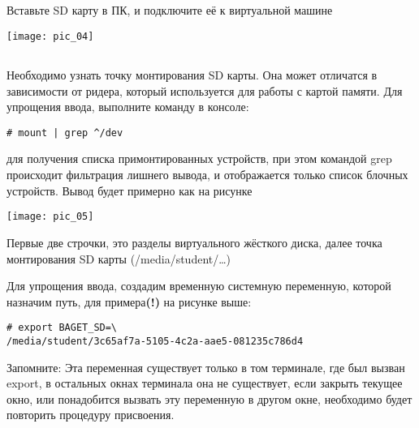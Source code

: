 \subsection{}Вставьте SD карту в ПК, и подключите её к виртуальной машине
\begin{center}
	\texttt{[image: pic\_04]}
\end{center}

\subsection{}Необходимо узнать точку монтирования SD карты. Она может отличатся в зависимости от ридера, который  используется для работы с картой памяти. Для упрощения ввода, выполните команду в консоле:
\begin{lstlisting}[style=bash]
# mount | grep ^/dev
\end{lstlisting}
для получения списка примонтированных устройств, при этом командой grep происходит фильтрация лишнего вывода, и отображается только список блочных устройств. Вывод будет примерно как на рисунке

\begin{center}
	\texttt{[image: pic\_05]}
\end{center}

Первые две строчки, это разделы виртуального жёсткого диска, далее точка монтирования SD карты (/media/student/…)

Для упрощения ввода, создадим временную системную переменную, которой назначим путь, для примера\textbf{(!)} на рисунке выше:
\begin{lstlisting}[style=bash]
# export BAGET_SD=\
/media/student/3c65af7a-5105-4c2a-aae5-081235c786d4
\end{lstlisting}

\begin{Notes}{Запомните:}
	Эта переменная существует только в том терминале, где был вызван export, в остальных окнах терминала она не существует, если закрыть текущее окно, или понадобится вызвать эту переменную в другом окне, необходимо будет повторить процедуру присвоения.
\end{Notes}

